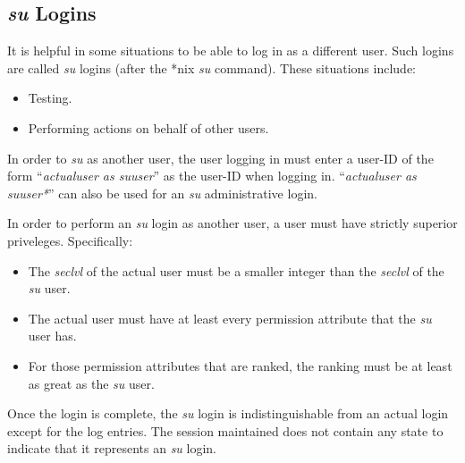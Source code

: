 \subsection{\emph{su} Logins}
\label{ctbg0:sddc0:ssul0}

It is helpful in some
situations to be able to log in as a different user.  Such logins are 
called \emph{su} logins (after the *nix \emph{su} command).  These situations
include:

\begin{itemize}
\item Testing.
\item Performing actions on behalf of other users.
\end{itemize}

In order to \emph{su} as another user, the user logging in
must enter a user-ID of the form ``\emph{actualuser as suuser}''
as the user-ID when logging in.  ``\emph{actualuser as suuser*}'' can
also be used for an \emph{su} administrative login.

In order to perform an \emph{su} login as another user, a user
must have strictly superior priveleges.  Specifically:

\begin{itemize}
\item The \emph{seclvl} of the actual user must be 
      a smaller integer than the \emph{seclvl} of the \emph{su} user.
\item The actual user must have at least every permission attribute
      that the \emph{su} user has.
\item For those permission attributes that are ranked, the ranking
      must be at least as great as the \emph{su} user.
\end{itemize}

Once the login is complete, the \emph{su} login is indistinguishable from an
actual login except for the log entries.  The session maintained does
not contain any state to indicate that it represents an \emph{su} login.


